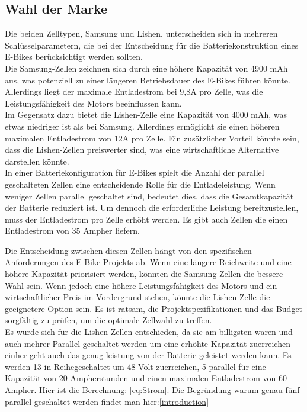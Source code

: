 \subsection{Wahl der Marke}
Die beiden Zelltypen, Samsung und Lishen, unterscheiden sich in mehreren Schlüsselparametern, die bei der Entscheidung für die Batteriekonstruktion eines E-Bikes berücksichtigt werden sollten.\\

Die Samsung-Zellen zeichnen sich durch eine höhere Kapazität von 4900 mAh aus, was potenziell zu einer längeren Betriebsdauer des E-Bikes führen könnte. Allerdings liegt der maximale Entladestrom bei 9,8A pro Zelle, was die Leistungsfähigkeit des Motors beeinflussen kann. \\

Im Gegensatz dazu bietet die Lishen-Zelle eine Kapazität von 4000 mAh, was etwas niedriger ist als bei Samsung. Allerdings ermöglicht sie einen höheren maximalen Entladestrom von 12A pro Zelle. Ein zusätzlicher Vorteil könnte sein, dass die Lishen-Zellen preiswerter sind, was eine wirtschaftliche Alternative darstellen könnte.\\

In einer Batteriekonfiguration für E-Bikes spielt die Anzahl der parallel geschalteten Zellen eine entscheidende Rolle für die Entladeleistung. Wenn weniger Zellen parallel geschaltet sind, bedeutet dies, dass die Gesamtkapazität der Batterie reduziert ist. Um dennoch die erforderliche Leistung bereitzustellen, muss der Entladestrom pro Zelle erhöht werden. Es gibt auch Zellen die einen Entladestrom von 35 Ampher liefern.

Die Entscheidung zwischen diesen Zellen hängt von den spezifischen Anforderungen des E-Bike-Projekts ab. Wenn eine längere Reichweite und eine höhere Kapazität priorisiert werden, könnten die Samsung-Zellen die bessere Wahl sein. Wenn jedoch eine höhere Leistungsfähigkeit des Motors und ein wirtschaftlicher Preis im Vordergrund stehen, könnte die Lishen-Zelle die geeignetere Option sein. Es ist ratsam, die Projektspezifikationen und das Budget sorgfältig zu prüfen, um die optimale Zellwahl zu treffen.\\

Es wurde sich für die Lishen-Zellen entschieden, da sie am billigsten waren und auch mehrer Parallel geschaltet werden um eine erhöhte Kapazität zuerreichen einher geht auch das genug leistung von der Batterie geleistet werden kann. Es werden 13 in Reihegeschaltet um 48 Volt zuerreichen, 5 parallel für eine Kapazität von 20 Ampherstunden und einen maximalen Entladestrom von 60 Ampher. Hier ist die Berechnung: \ref*{eq:Strom}. Die Begründung warum genau fünf parallel geschaltet werden findet man hier:\ref{introduction}\\

